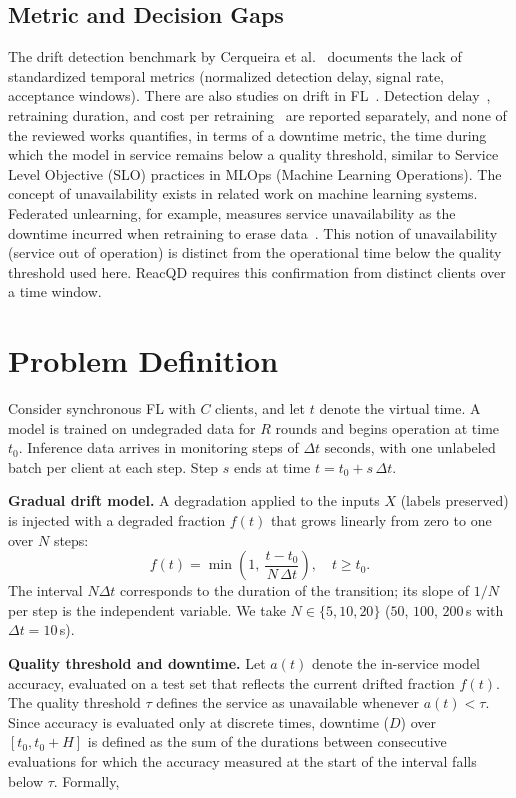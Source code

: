 \documentclass[conference]{IEEEtran}
\begin{document}
\subsection{Metric and Decision Gaps}
The drift detection benchmark by Cerqueira et al.~\cite{cerqueira2026} documents the lack of standardized temporal metrics (normalized detection delay, signal rate, acceptance windows). There are also studies on drift in FL~\cite{mahdi2025}. Detection delay~\cite{baier2023,chow2023}, retraining duration, and cost per retraining~\cite{han2026} are reported separately, and none of the reviewed works quantifies, in terms of a downtime metric, the time during which the model in service remains below a quality threshold, similar to Service Level Objective (SLO) practices in MLOps (Machine Learning Operations). The concept of unavailability exists in related work on machine learning systems. Federated unlearning, for example, measures service unavailability as the downtime incurred when retraining to erase data~\cite{zhang2025}. This notion of unavailability (service out of operation) is distinct from the operational time below the quality threshold used here. ReacQD requires this confirmation from distinct clients over a time window.

\section{Problem Definition}
Consider synchronous FL with $C$ clients, and let $t$ denote the virtual time. A model is trained on undegraded data for $R$ rounds and begins operation at time $t_0$. Inference data arrives in monitoring steps of $\Delta t$ seconds, with one unlabeled batch per client at each step. Step $s$ ends at time $t=t_0+s\,\Delta t$.

\medskip\noindent
\textbf{Gradual drift model.} A degradation applied to the inputs $X$ (labels preserved) is injected with a degraded fraction $f(t)$ that grows linearly from zero to one over $N$ steps:
\begin{equation}
f(t) = \min\!\left(1,\ \frac{t-t_0}{N\,\Delta t}\right),
\quad t\ge t_0 .
\label{eq:ramp}
\end{equation}
The interval $N\Delta t$ corresponds to the duration of the transition; its slope of $1/N$ per step is the independent variable. We take $N\in\{5,10,20\}$ ($50$, $100$, $200$\,s with $\Delta t=10$\,s).

\medskip\noindent
\textbf{Quality threshold and downtime.} Let $a(t)$ denote the in-service model accuracy, evaluated on a test set that reflects the current drifted fraction $f(t)$. The quality threshold $\tau$ defines the service as unavailable whenever $a(t) < \tau$. Since accuracy is evaluated only at discrete times, downtime ($D$) over $[t_0, t_0+H]$ is defined as the sum of the durations between consecutive evaluations for which the accuracy measured at the start of the interval falls below $\tau$. Formally,
\end{document}
